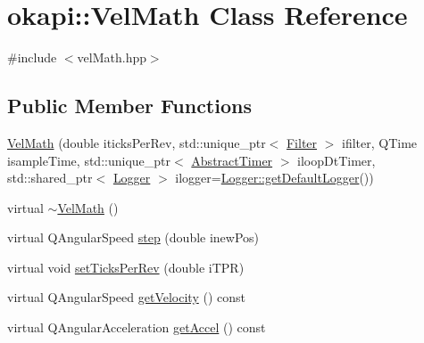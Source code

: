 \hypertarget{classokapi_1_1VelMath}{}\section{okapi\+::Vel\+Math Class Reference}
\label{classokapi_1_1VelMath}


{\ttfamily \#include $<$vel\+Math.\+hpp$>$}

\subsection*{Public Member Functions}
\begin{DoxyCompactItemize}
\item 
\mbox{\hyperlink{classokapi_1_1VelMath_af70c4c5ae0a71719e833ba375f76b5d1}{Vel\+Math}} (double iticks\+Per\+Rev, std\+::unique\+\_\+ptr$<$ \mbox{\hyperlink{classokapi_1_1Filter}{Filter}} $>$ ifilter, Q\+Time isample\+Time, std\+::unique\+\_\+ptr$<$ \mbox{\hyperlink{classokapi_1_1AbstractTimer}{Abstract\+Timer}} $>$ iloop\+Dt\+Timer, std\+::shared\+\_\+ptr$<$ \mbox{\hyperlink{classokapi_1_1Logger}{Logger}} $>$ ilogger=\mbox{\hyperlink{classokapi_1_1Logger_a5053cf778b4b55acba788a3797dc96d2}{Logger\+::get\+Default\+Logger}}())
\item 
virtual \mbox{\hyperlink{classokapi_1_1VelMath_a555b678899ad8e231543d6f206ae0db6}{$\sim$\+Vel\+Math}} ()
\item 
virtual Q\+Angular\+Speed \mbox{\hyperlink{classokapi_1_1VelMath_a4c6e14c7f2054512b59a30736f61982f}{step}} (double inew\+Pos)
\item 
virtual void \mbox{\hyperlink{classokapi_1_1VelMath_a0a95837a35bfb2702a170da95daba559}{set\+Ticks\+Per\+Rev}} (double i\+T\+PR)
\item 
virtual Q\+Angular\+Speed \mbox{\hyperlink{classokapi_1_1VelMath_ae366b0895bfac15e986448aa9c22b26c}{get\+Velocity}} () const
\item 
virtual Q\+Angular\+Acceleration \mbox{\hyperlink{classokapi_1_1VelMath_ac47c50d2fc6035739607801d1aa2272d}{get\+Accel}} () const
\end{DoxyCompactItemize}

